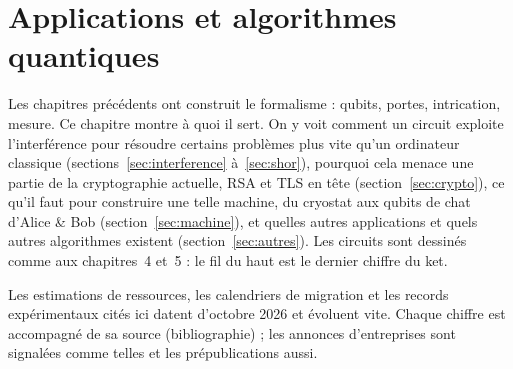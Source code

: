 
\providecommand{\ket}[1]{|#1\rangle}
\providecommand{\bra}[1]{\langle #1|}
\providecommand{\braket}[2]{\langle #1|#2\rangle}

\section{Applications et algorithmes quantiques}\label{chap:applications}

Les chapitres précédents ont construit le formalisme : qubits, portes, intrication, mesure. Ce
chapitre montre à quoi il sert. On y voit comment un circuit exploite l'interférence pour résoudre
certains problèmes plus vite qu'un ordinateur classique (sections~\ref{sec:interference}
à~\ref{sec:shor}), pourquoi cela menace une partie de la cryptographie actuelle, RSA et TLS en tête
(section~\ref{sec:crypto}), ce qu'il faut pour construire une telle machine, du cryostat aux qubits
de chat d'Alice \& Bob (section~\ref{sec:machine}), et quelles autres applications et quels autres
algorithmes existent (section~\ref{sec:autres}). Les circuits sont dessinés comme aux chapitres~4 et~5 :
le fil du haut est le dernier chiffre du ket.

\begin{remarque}
Les estimations de ressources, les calendriers de migration et les records expérimentaux cités ici
datent d'octobre 2026 et évoluent vite. Chaque chiffre est accompagné de sa source (bibliographie) ;
les annonces d'entreprises sont signalées comme telles et les prépublications aussi.
\end{remarque}

